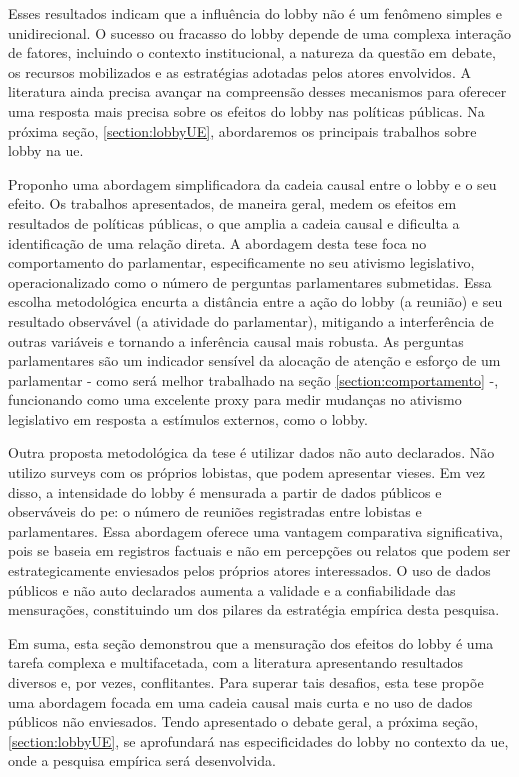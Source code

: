 Esses resultados indicam que a influência do lobby não é um fenômeno simples e unidirecional. O sucesso ou fracasso do lobby depende de uma complexa interação de fatores, incluindo o contexto institucional, a natureza da questão em debate, os recursos mobilizados e as estratégias adotadas pelos atores envolvidos. A literatura ainda precisa avançar na compreensão desses mecanismos para oferecer uma resposta mais precisa sobre os efeitos do lobby nas políticas públicas. Na próxima seção, \ref{section:lobbyUE}, abordaremos os principais trabalhos sobre lobby na \acrshort{ue}.

Proponho uma abordagem simplificadora da cadeia causal entre o lobby e o seu efeito. Os trabalhos apresentados, de maneira geral, medem os efeitos em resultados de políticas públicas, o que amplia a cadeia causal e dificulta a identificação de uma relação direta. A abordagem desta tese foca no comportamento do parlamentar, especificamente no seu ativismo legislativo, operacionalizado como o número de perguntas parlamentares submetidas. Essa escolha metodológica encurta a distância entre a ação do lobby (a reunião) e seu resultado observável (a atividade do parlamentar), mitigando a interferência de outras variáveis e tornando a inferência causal mais robusta. As perguntas parlamentares são um indicador sensível da alocação de atenção e esforço de um parlamentar - como será melhor trabalhado na seção \ref{section:comportamento} -, funcionando como uma excelente proxy para medir mudanças no ativismo legislativo em resposta a estímulos externos, como o lobby.

Outra proposta metodológica da tese é utilizar dados não auto declarados. Não utilizo surveys com os próprios lobistas, que podem apresentar vieses. Em vez disso, a intensidade do lobby é mensurada a partir de dados públicos e observáveis do \acrshort{pe}: o número de reuniões registradas entre lobistas e parlamentares. Essa abordagem oferece uma vantagem comparativa significativa, pois se baseia em registros factuais e não em percepções ou relatos que podem ser estrategicamente enviesados pelos próprios atores interessados. O uso de dados públicos e não auto declarados aumenta a validade e a confiabilidade das mensurações, constituindo um dos pilares da estratégia empírica desta pesquisa.

Em suma, esta seção demonstrou que a mensuração dos efeitos do lobby é uma tarefa complexa e multifacetada, com a literatura apresentando resultados diversos e, por vezes, conflitantes. Para superar tais desafios, esta tese propõe uma abordagem focada em uma cadeia causal mais curta e no uso de dados públicos não enviesados. Tendo apresentado o debate geral, a próxima seção, \ref{section:lobbyUE}, se aprofundará nas especificidades do lobby no contexto da \acrshort{ue}, onde a pesquisa empírica será desenvolvida.

 